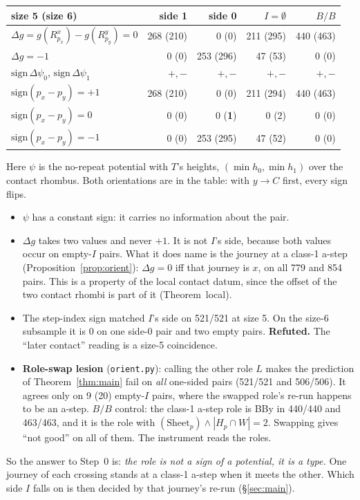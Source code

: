 \documentclass[11pt]{article}
\theoremstyle{definition}\newtheorem{definition}[theorem]{Definition}\newtheorem{remark}[theorem]{Remark}
\begin{document}
\begin{center}\small\begin{tabular}{lrrrr}\toprule
size 5 (size 6) & side 1 & side 0 & $I=\emptyset$ & $B/B$\\\midrule
$\Delta g=g(R^x_{p_x})-g(R^y_{p_y})=0$ & 268 (210) & 0 (0) & 211 (295) & 440 (463)\\
$\Delta g=-1$ & 0 (0) & 253 (296) & 47 (53) & 0 (0)\\
$\mathrm{sign}\,\Delta\psi_0$, $\mathrm{sign}\,\Delta\psi_1$ & $+,-$ & $+,-$ & $+,-$ & $+,-$\\
$\mathrm{sign}(p_x-p_y)=+1$ & 268 (210) & 0 (0) & 211 (294) & 440 (463)\\
$\mathrm{sign}(p_x-p_y)=0$ & 0 (0) & 0 (\textbf{1}) & 0 (2) & 0 (0)\\
$\mathrm{sign}(p_x-p_y)=-1$ & 0 (0) & 253 (295) & 47 (52) & 0 (0)\\
\bottomrule\end{tabular}\end{center}
Here $\psi$ is the no-repeat potential with $T$'s heights, $(\min h_0,\min h_1)$ over the contact rhombus. Both orientations are in the table: with $y\to C$ first, every sign flips.
\begin{itemize}
\item $\psi$ has a constant sign: it carries no information about the pair.
\item $\Delta g$ takes two values and never $+1$. It is not $I$'s side, because both values occur on empty-$I$ pairs. What it does name is the journey at a class-1 a-step (Proposition~\ref{prop:orient}): $\Delta g=0$ iff that journey is $x$, on all 779 and 854 pairs. This is a property of the local contact datum, since the offset of the two contact rhombi is part of it (Theorem~local).
\item The step-index sign matched $I$'s side on 521/521 at size 5. On the size-6 subsample it is $0$ on one side-0 pair and two empty pairs. \textbf{Refuted.} The ``later contact'' reading is a size-5 coincidence.
\item \textbf{Role-swap lesion} (\texttt{orient.py}): calling the other role $L$ makes the prediction of Theorem~\ref{thm:main} fail on \emph{all} one-sided pairs (521/521 and 506/506). It agrees only on 9 (20) empty-$I$ pairs, where the swapped role's re-run happens to be an a-step. $B/B$ control: the class-1 a-step role is BBy in 440/440 and 463/463, and it is the role with $(\mathrm{Sheet}_p)\wedge|H_p\cap W|=2$. Swapping gives ``not good'' on all of them. The instrument reads the roles.
\end{itemize}
So the answer to Step~0 is: \emph{the role is not a sign of a potential, it is a type.} One journey of each crossing stands at a class-1 a-step when it meets the other. Which side $I$ falls on is then decided by that journey's re-run (\S\ref{sec:main}).
\end{document}
